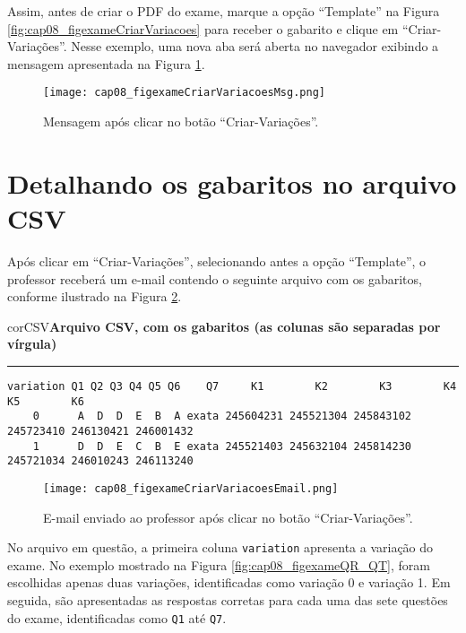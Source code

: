 Assim, antes de criar o PDF do exame, marque a opção ``Template'' na Figura \ref{fig:cap08_figexameCriarVariacoes} para receber o gabarito e clique em ``Criar-Variações''. Nesse exemplo, uma nova aba será aberta no navegador exibindo a mensagem apresentada na Figura \ref{fig:cap08_figexameCriarVariacoesMsg}. 

\begin{figure}[!ht]
  \centering
  \texttt{[image: cap08\_figexameCriarVariacoesMsg.png]}
   \caption{Mensagem após clicar no botão ``Criar-Variações''.}
\label{fig:cap08_figexameCriarVariacoesMsg}
\end{figure}


\section{Detalhando os gabaritos no arquivo CSV}\label{sec:QMgabarito}

Após clicar em ``Criar-Variações'', selecionando antes a opção ``Template'', o professor receberá um e-mail contendo o seguinte arquivo com os gabaritos, conforme ilustrado na Figura \ref{fig:cap08_figexameCriarVariacoesEmail}.

\begin{myboxCode}{corCSV}{\textbf{Arquivo CSV, com os gabaritos (as colunas são separadas por vírgula)}}\vspace{3mm}
\hrule
{\footnotesize
\begin{verbatim}
variation Q1 Q2 Q3 Q4 Q5 Q6    Q7     K1        K2        K3        K4        K5        K6
    0      A  D  D  E  B  A exata 245604231 245521304 245843102 245723410 246130421 246001432
    1      D  D  E  C  B  E exata 245521403 245632104 245814230 245721034 246010243 246113240
\end{verbatim}
}
\end{myboxCode}

\begin{figure}[!ht]
  \centering
  \texttt{[image: cap08\_figexameCriarVariacoesEmail.png]}
   \caption{E-mail enviado ao professor após clicar no botão ``Criar-Variações''.}
\label{fig:cap08_figexameCriarVariacoesEmail}
\end{figure}


No arquivo em questão, a primeira coluna \verb|variation| apresenta a variação do exame. No exemplo mostrado na Figura \ref{fig:cap08_figexameQR_QT}, foram escolhidas apenas duas variações, identificadas como variação 0 e variação 1. Em seguida, são apresentadas as respostas corretas para cada uma das sete questões do exame, identificadas como \verb|Q1| até \verb|Q7|.

